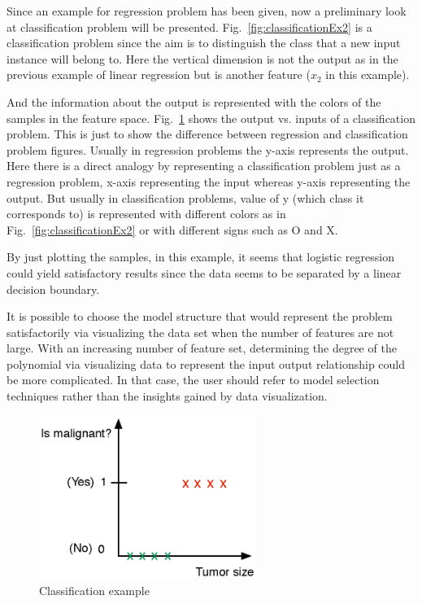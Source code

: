 Since an example for regression problem has been given, now a preliminary look at classification problem will be presented. 
Fig.~\ref{fig:classificationEx2} is a classification problem since the aim is to distinguish the class that a new input instance will belong to. 
Here the vertical dimension is not the output as in the previous example of linear regression but is another feature ($x_2$ in this example). 

And the information about the output is represented with the colors of the samples in the feature space.
Fig.~\ref{fig:classificationEx1} shows the output vs. inputs of a classification problem. 
This is just to show the difference between regression and classification problem figures. 
Usually in regression problems the y-axis represents the output. 
Here there is a direct analogy by representing a classification problem just as a regression problem, x-axis representing the input whereas y-axis representing the output. 
But usually in classification problems, value of y (which class it corresponds to) is represented with different colors as in Fig.~\ref{fig:classificationEx2} or with different signs such as O and X.

By just plotting the samples, in this example, it seems that logistic regression could yield satisfactory results since the data seems to be separated by a linear decision boundary. 

It is possible to choose the model structure that would represent the problem satisfactorily via visualizing the data set when the number of features are not large.
With an increasing number of feature set, determining the degree of the polynomial via visualizing data to represent the input output relationship could be more complicated. 
In that case, the user should refer to model selection techniques rather than the insights gained by data visualization. 


\begin{figure}
\begin{center}
\includegraphics[width=7cm]{figures/classificationEx1}    %
\caption{Classification example} 
\label{fig:classificationEx1}
\end{center}
\end{figure}


